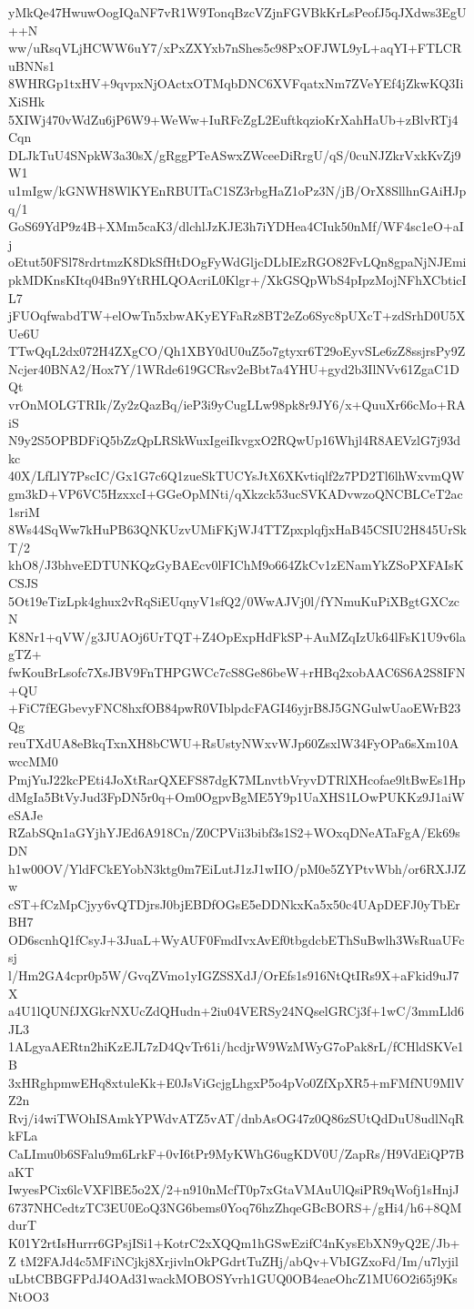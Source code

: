 yMkQe47HwuwOogIQaNF7vR1W9TonqBzcVZjnFGVBkKrLsPeofJ5qJXdws3EgU++N
ww/uRsqVLjHCWW6uY7/xPxZXYxb7nShes5c98PxOFJWL9yL+aqYI+FTLCRuBNNs1
8WHRGp1txHV+9qvpxNjOActxOTMqbDNC6XVFqatxNm7ZVeYEf4jZkwKQ3IiXiSHk
5XIWj470vWdZu6jP6W9+WeWw+IuRFcZgL2EuftkqzioKrXahHaUb+zBlvRTj4Cqn
DLJkTuU4SNpkW3a30sX/gRggPTeASwxZWceeDiRrgU/qS/0cuNJZkrVxkKvZj9W1
u1mIgw/kGNWH8WlKYEnRBUITaC1SZ3rbgHaZ1oPz3N/jB/OrX8SllhnGAiHJpq/1
GoS69YdP9z4B+XMm5caK3/dlchlJzKJE3h7iYDHea4CIuk50nMf/WF4sc1eO+aIj
oEtut50FSl78rdrtmzK8DkSfHtDOgFyWdGljcDLbIEzRGO82FvLQn8gpaNjNJEmi
pkMDKnsKItq04Bn9YtRHLQOAcriL0Klgr+/XkGSQpWbS4pIpzMojNFhXCbticIL7
jFUOqfwabdTW+elOwTn5xbwAKyEYFaRz8BT2eZo6Syc8pUXcT+zdSrhD0U5XUe6U
TTwQqL2dx072H4ZXgCO/Qh1XBY0dU0uZ5o7gtyxr6T29oEyvSLe6zZ8ssjrsPy9Z
Ncjer40BNA2/Hox7Y/1WRde619GCRsv2eBbt7a4YHU+gyd2b3IlNVv61ZgaC1DQt
vrOnMOLGTRIk/Zy2zQazBq/ieP3i9yCugLLw98pk8r9JY6/x+QuuXr66cMo+RAiS
N9y2S5OPBDFiQ5bZzQpLRSkWuxIgeiIkvgxO2RQwUp16Whjl4R8AEVzlG7j93dkc
40X/LfLlY7PscIC/Gx1G7c6Q1zueSkTUCYsJtX6XKvtiqlf2z7PD2Tl6lhWxvmQW
gm3kD+VP6VC5HzxxcI+GGeOpMNti/qXkzck53ucSVKADvwzoQNCBLCeT2ac1sriM
8Ws44SqWw7kHuPB63QNKUzvUMiFKjWJ4TTZpxplqfjxHaB45CSIU2H845UrSkT/2
khO8/J3bhveEDTUNKQzGyBAEcv0lFIChM9o664ZkCv1zENamYkZSoPXFAIsKCSJS
5Ot19eTizLpk4ghux2vRqSiEUqnyV1sfQ2/0WwAJVj0l/fYNmuKuPiXBgtGXCzcN
K8Nr1+qVW/g3JUAOj6UrTQT+Z4OpExpHdFkSP+AuMZqIzUk64lFsK1U9v6lagTZ+
fwKouBrLsofc7XsJBV9FnTHPGWCc7cS8Ge86beW+rHBq2xobAAC6S6A2S8IFN+QU
+FiC7fEGbevyFNC8hxfOB84pwR0VIblpdcFAGI46yjrB8J5GNGulwUaoEWrB23Qg
reuTXdUA8eBkqTxnXH8bCWU+RsUstyNWxvWJp60ZsxlW34FyOPa6sXm10AwccMM0
PmjYuJ22kcPEti4JoXtRarQXEFS87dgK7MLnvtbVryvDTRlXHcofae9ltBwEs1Hp
dMgIa5BtVyJud3FpDN5r0q+Om0OgpvBgME5Y9p1UaXHS1LOwPUKKz9J1aiWeSAJe
RZabSQn1aGYjhYJEd6A918Cn/Z0CPVii3bibf3s1S2+WOxqDNeATaFgA/Ek69sDN
h1w00OV/YldFCkEYobN3ktg0m7EiLutJ1zJ1wIIO/pM0e5ZYPtvWbh/or6RXJJZw
cST+fCzMpCjyy6vQTDjrsJ0bjEBDfOGsE5eDDNkxKa5x50c4UApDEFJ0yTbErBH7
OD6scnhQ1fCsyJ+3JuaL+WyAUF0FmdIvxAvEf0tbgdcbEThSuBwlh3WsRuaUFcsj
l/Hm2GA4cpr0p5W/GvqZVmo1yIGZSSXdJ/OrEfs1s916NtQtIRs9X+aFkid9uJ7X
a4U1lQUNfJXGkrNXUcZdQHudn+2iu04VERSy24NQselGRCj3f+1wC/3mmLld6JL3
1ALgyaAERtn2hiKzEJL7zD4QvTr61i/hcdjrW9WzMWyG7oPak8rL/fCHldSKVe1B
3xHRghpmwEHq8xtuleKk+E0JsViGcjgLhgxP5o4pVo0ZfXpXR5+mFMfNU9MlVZ2n
Rvj/i4wiTWOhISAmkYPWdvATZ5vAT/dnbAsOG47z0Q86zSUtQdDuU8udlNqRkFLa
CaLImu0b6SFalu9m6LrkF+0vI6tPr9MyKWhG6ugKDV0U/ZapRs/H9VdEiQP7BaKT
IwyesPCix6lcVXFlBE5o2X/2+n910nMcfT0p7xGtaVMAuUlQsiPR9qWofj1sHnjJ
6737NHCedtzTC3EU0EoQ3NG6bems0Yoq76hzZhqeGBcBORS+/gHi4/h6+8QMdurT
K01Y2rtIsHurrr6GPsjISi1+KotrC2xXQQm1hGSwEzifC4nKysEbXN9yQ2E/Jb+Z
tM2FAJd4c5MFiNCjkj8XrjivlnOkPGdrtTuZHj/abQv+VbIGZxoFd/Im/u7lyjil
uLbtCBBGFPdJ4OAd31wackMOBOSYvrh1GUQ0OB4eaeOhcZ1MU6O2i65j9KsNtOO3
